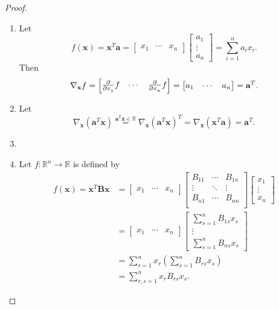 \documentclass[12pt,openany]{book}
\theoremstyle{definition}
\newcommand{\R}{\mathbb{R}}
\newcommand{\of}[1]{\left( #1 \right)}
\newcommand{\grad}{\nabla}
\renewcommand{\vec}[1]{\textbf{#1}}
\begin{document}
\begin{proof}
	\begin{enumerate}[(1)]
		\item Let \[
		f(\vec{x})=\vec{x}^T\vec{a}=\begin{bmatrix}
			x_1 & \cdots & x_n
		\end{bmatrix}\begin{bmatrix}
		a_1 \\ \vdots \\ a_n
	\end{bmatrix}=\sum_{i=1}^na_ix_i.
		\] Then \[
		\grad_\vec{x}f=\begin{bmatrix}
			\pd{}{x_1}f & \cdots & \pd{}{x_n}f
		\end{bmatrix}=\begin{bmatrix}
		a_1 & \cdots & a_n
	\end{bmatrix}=\vec{a}^T.
		\]
		\item Let \[
		\grad_\vec{x}\of{\vec{a}^T\vec{x}}\overset{\vec{a}^T\vec{x}\in\R}{=}
		\grad_\vec{x}(\vec{a}^T\vec{x})^T=\grad_\vec{x}\of{\vec{x}^T\vec{a}}=\vec{a}^T.
		\]
		\item 
		\item Let $f:\R^n\to\R$ is defined by 
		\begin{align*}
			f(\vec{x})=\vec{x}^T\vec{B}\vec{x}&=\begin{bmatrix}
				x_1 & \cdots & x_n
			\end{bmatrix}\begin{bmatrix}
				B_{11} & \cdots & B_{1n}\\
				\vdots & \ddots & \vdots\\
				B_{n1} & \cdots & B_{nn}\\
			\end{bmatrix}\begin{bmatrix}
			x_1 \\ \vdots \\ x_n
		\end{bmatrix}\\
			&=\begin{bmatrix}
				x_1 & \cdots & x_n
			\end{bmatrix}\begin{bmatrix}
				\sum_{s=1}^nB_{1s}x_s \\ \vdots \\ \sum_{s=1}^nB_{ns}x_s
			\end{bmatrix}\\
			&=\sum_{r=1}^nx_r\of{\sum_{s=1}^nB_{rs}x_s}\\
			&=\sum_{r,s=1}^nx_rB_{rs}x_s.

\end{align*}
\end{enumerate}
\end{proof}
\end{document}
